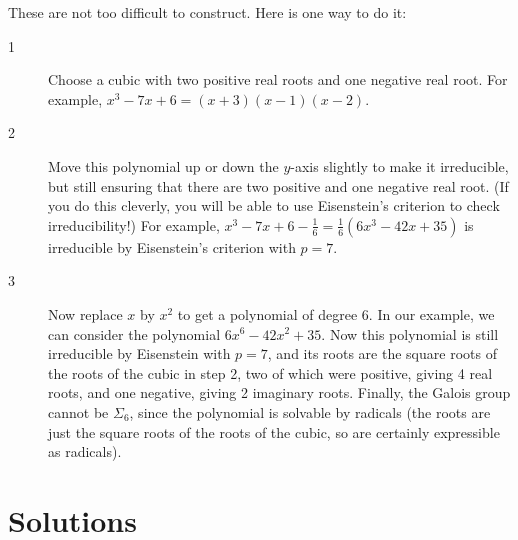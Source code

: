 \documentclass{amsart}
\newcommand{\Sg}        {\Sigma}
\renewcommand{\:}{\colon}
\newcommand{\includesolutions}{
 \immediate\closeout\solsfile
 
}
\newenvironment{solution}{\SolutionInline}{\endSolutionInline}
\theoremstyle{definition}
\renewenvironment{solution}{\SolutionAtEnd}{\endSolutionAtEnd}
\begin{document}
\begin{solution}
 These are not too difficult to construct. Here is one way to do it:
 \begin{description}
  \item[1] Choose a cubic with two positive real roots and one negative real
  root. For example, $x^3-7x+6=(x+3)(x-1)(x-2)$.
  \item[2] Move this polynomial up or down the $y$-axis slightly to make it
  irreducible, but still ensuring that there are two positive and one
  negative real root. (If you do this cleverly, you will be able to use
  Eisenstein's criterion to check irreducibility!) For example, 
  $x^3-7x+6-\frac{1}{6}=\frac{1}{6}(6x^3-42x+35)$ is irreducible by
  Eisenstein's criterion with $p=7$.
  \item[3] Now replace $x$ by $x^2$ to get a polynomial of degree 6. In our
  example, we can consider the polynomial $6x^6-42x^2+35$. Now this polynomial 
  is still irreducible by Eisenstein with $p=7$, and its roots are the square
  roots of the roots of the cubic in step 2, two of which were positive, 
  giving 4 real roots, and one negative, giving 2 imaginary roots. Finally, the
  Galois group cannot be $\Sg_6$, since the polynomial is solvable by radicals
  (the roots are just the square roots of the roots of the cubic, so are
  certainly expressible as radicals).
 \end{description} 
\end{solution}





\newpage

\section*{Solutions}
\label{apx-solutions}

\includesolutions


\end{document}
